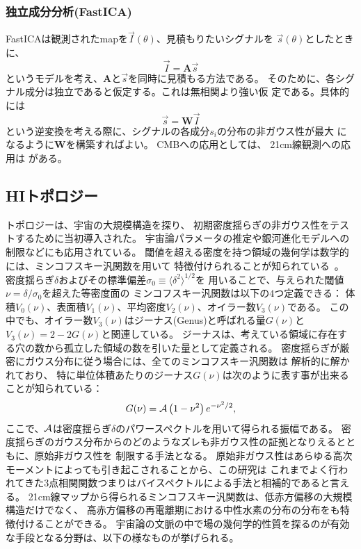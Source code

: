 \subsubsection{独立成分分析(FastICA)}

FastICAは観測されたmapを$\vec{I}(\theta)$、見積もりたいシグナルを
$\vec{s}(\theta)$としたときに、
\begin{equation}
 \vec{I} = \bm{A}\vec{s}
\end{equation}
というモデルを考え、$\bm{A}$と$\vec{s}$を同時に見積もる方法である。
そのために、各シグナル成分は独立であると仮定する。これは無相関より強い仮
定である。具体的には
\begin{equation}
 \vec{s} = \bm{W}\vec{I}
\end{equation}
という逆変換を考える際に、シグナルの各成分$s_i$の分布の非ガウス性が最大
になるように$\bm{W}$を構築すればよい。
CMBへの応用としては\cite{2002MNRAS.334...53M,2014ApJ...780...13I}、
21cm線観測への応用は\cite{2012MNRAS.423.2518C,2014MNRAS.441.3271W} がある。





\subsection{HIトポロジー}\label{cosmology.s2.ss4}

トポロジーは、宇宙の大規模構造を探り、
初期密度揺らぎの非ガウス性をテストするために当初導入された。
宇宙論パラメータの推定や銀河進化モデルへの制限などにも応用されている。
閾値を超える密度を持つ領域の幾何学は数学的には、ミンコフスキー汎関数を用いて
特徴付けられることが知られている~\citep{2008MNRAS.385.1613H}。
密度揺らぎ$\delta$およびその標準偏差$\sigma_0\equiv\langle\delta^2\rangle^{1/2}$を
用いることで、与えられた閾値$\nu =\delta /\sigma_0$を超えた等密度面の
ミンコフスキー汎関数は以下の$4$つ定義できる：
体積$V_0(\nu )$、表面積$V_1(\nu )$、平均密度$V_2(\nu )$、オイラー数$V_3(\nu)$である。
この中でも、オイラー数$V_3(\nu )$はジーナス(Genus)と呼ばれる量$G(\nu)$と
$V_3(\nu )=2-2G(\nu )$と関連している。
ジーナスは、考えている領域に存在する穴の数から孤立した領域の数を引いた量として定義される。
密度揺らぎが厳密にガウス分布に従う場合には、全てのミンコフスキー汎関数は
解析的に解かれており、
特に単位体積あたりのジーナス$G(\nu )$は次のように表す事が出来ることが知られている：
\begin{equation}
G(\nu)={\cal A}\left( 1-\nu^{2}\right) e^{-\nu^{2}/2},
\label{eq:genus}
\end{equation}
ここで、${\cal A}$は密度揺らぎ$\delta$のパワースペクトルを用いて得られる振幅である。
密度揺らぎのガウス分布からのどのようなズレも非ガウス性の証拠となりえるとともに、原始非ガウス性を
制限する手法となる。
原始非ガウス性はあらゆる高次モーメントによっても引き起こされることから、この研究は
これまでよく行われてきた$3$点相関関数つまりはバイスペクトルによる手法と相補的であると言える。
21cm線マップから得られるミンコフスキー汎関数は、低赤方偏移の大規模構造だけでなく、
高赤方偏移の再電離期における中性水素の分布の分布をも特徴付けることができる。
宇宙論の文脈の中で場の幾何学的性質を探るのが有効な手段となる分野は、以下の様なものが挙げられる。


